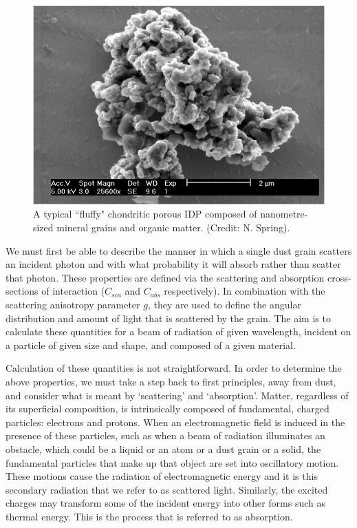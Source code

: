 \begin{figure}
\centering
\includegraphics[scale=0.5]{chapters/chapter1/figs/dust_grain.png}
\caption{A typical ``fluffy" chondritic porous IDP composed of nanometre-sized mineral grains and organic matter. (Credit: N. Spring).}
\label{dust_grain}
\end{figure}

We must first be able to describe the manner in which a single dust grain scatters an incident photon and with what probability it will absorb rather than scatter that photon. These properties are defined via the scattering and absorption cross-sections of interaction ($C_{sca}$ and $C_{abs}$ respectively).  In combination with the scattering anisotropy parameter $g$, they are used to define the angular distribution and amount of  light that is scattered by the grain.  The aim is to calculate these quantities for a beam of radiation of given wavelength, incident on a particle of given size and shape, and composed of a given material.   

Calculation of these quantities is not straightforward.  In order to determine the above properties, we must take a step back to first principles, away from dust, and consider what is meant by `scattering' and `absorption'.  Matter, regardless of its superficial composition, is intrinsically composed of fundamental, charged particles: electrons and protons.  When an electromagnetic field is induced in the presence of these particles, such as when a beam of radiation illuminates an obstacle, which could be a liquid or an atom or a dust grain or a solid, the fundamental particles that make up that object are set into oscillatory motion.  These motions cause the radiation of electromagnetic energy and it is this secondary radiation that we refer to as scattered light.  Similarly, the excited charges may transform some of the incident energy into other forms such as thermal energy.  This is the process that is referred to as absorption.

